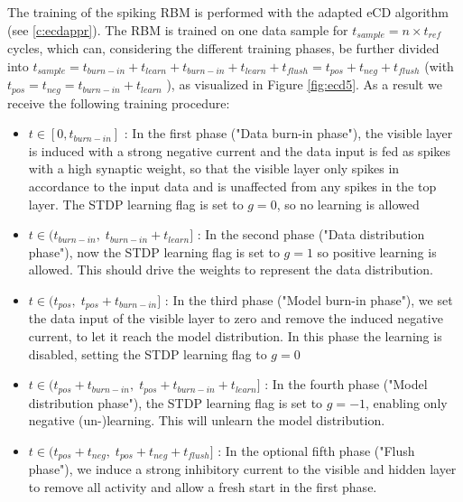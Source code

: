 The training of the spiking RBM is performed with the adapted eCD algorithm (see \ref{c:ecdappr}).
The RBM is trained on one data sample for $t_{sample} = n \times t_{ref}$ cycles, which can, considering the different training phases, be further divided into $t_{sample} = t_{burn-in} + t_{learn} + t_{burn-in} + t_{learn} + t_{flush} = t_{pos} + t_{neg} + t_{flush}$ (with $t_{pos} = t_{neg} = t_{burn-in} + t_{learn}$ ), as visualized in Figure \ref{fig:ecd5}. 
As a result we receive the following training procedure:
\begin{itemize}

\item $t \in [0, t_{burn-in}]$ : In the first phase ("Data burn-in phase"), the visible layer is induced with a strong negative current and the data input is fed as spikes with a high synaptic weight, so that the visible layer only spikes in accordance to the input data and is unaffected from any spikes in the top layer.
The STDP learning flag is set to $g=0$, so no learning is allowed

\item $t \in (t_{burn-in} , \; t_{burn-in} + t_{learn}]$ : In the second phase ("Data distribution phase"), now the STDP learning flag is set to $g=1$ so positive learning is allowed.
This should drive the weights to represent the data distribution.

\item $t \in (t_{pos}, \;  t_{pos} + t_{burn-in}]$ : In the third phase ("Model burn-in phase"), we set the data input of the visible layer to zero and remove the induced negative current, to let it reach the model distribution.
In this phase the learning is disabled, setting the STDP learning flag to $g=0$

\item $t \in (t_{pos} + t_{burn-in}, \;  t_{pos} + t_{burn-in} + t_{learn}]$ : In the fourth phase ("Model distribution phase"), the STDP learning flag is set to $g=-1$, enabling only negative (un-)learning.
This will unlearn the model distribution.

\item $t \in (t_{pos} + t_{neg}, \;  t_{pos} + t_{neg} + t_{flush}]$ : In the optional fifth phase ("Flush phase"), we induce a strong inhibitory current to the visible and hidden layer to remove all activity and allow a fresh start in the first phase.

\end{itemize}


